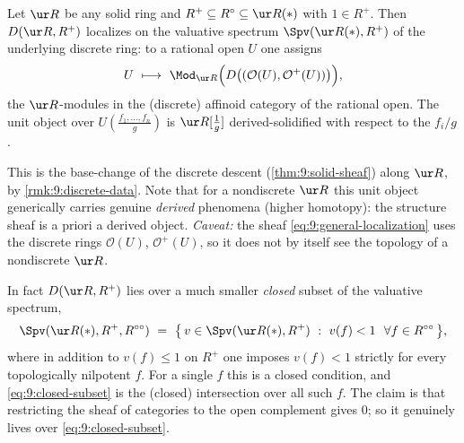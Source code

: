 \begin{corollary}
\label{cor:9:general-solid}
Let $\ur R$ be any solid ring and $R^{+}\subseteq R^{\circ}\subseteq\ur R(\ast)$
with $1\in R^{+}$. Then $D(\ur R,R^{+})$ localizes on the valuative spectrum
$\Spv(\ur R(\ast),R^{+})$ of the underlying discrete ring: to a rational open
$U$ one assigns
\begin{equation}
\label{eq:9:general-localization}
U\ \longmapsto\ \Mod_{\ur R}\Bigl(D\bigl((\mathcal O(U),\mathcal O^{+}(U))
\bigr)\Bigr),
\end{equation}
the $\ur R$-modules in the (discrete) affinoid category of the rational open.
The unit object over $U(\tfrac{f_{1},\dots,f_{n}}{g})$ is $\ur R[\tfrac1g]$
derived-solidified with respect to the $f_{i}/g$.
\end{corollary}

This is the base-change of the discrete descent (\cref{thm:9:solid-sheaf}) along
$\ur R$, by \cref{rmk:9:discrete-data}. Note that for a nondiscrete $\ur R$ this
unit object generically carries genuine \emph{derived} phenomena (higher
homotopy): the structure sheaf is a priori a derived object. \emph{Caveat:} the
sheaf \eqref{eq:9:general-localization} uses the discrete rings $\mathcal O(U)$,
$\mathcal O^{+}(U)$, so it does not by itself see the topology of a nondiscrete
$\ur R$.

\begin{remark}
\label{rmk:9:closed-subset}
In fact $D(\ur R,R^{+})$ lies over a much smaller \emph{closed} subset of the
valuative spectrum,
\begin{equation}
\label{eq:9:closed-subset}
\Spv(\ur R(\ast),R^{+},R^{\circ\circ})\ =\ \bigl\{\,v\in\Spv(\ur R(\ast),R^{+})\
:\ v(f)<1\ \ \forall f\in R^{\circ\circ}\,\bigr\},
\end{equation}
where in addition to $v(f)\le 1$ on $R^{+}$ one imposes $v(f)<1$ strictly for
every topologically nilpotent $f$. For a single $f$ this is a closed condition,
and \eqref{eq:9:closed-subset} is the (closed) intersection over all such $f$.
The claim is that restricting the sheaf of categories to the open complement
gives $0$; so it genuinely lives over \eqref{eq:9:closed-subset}.
\end{remark}

